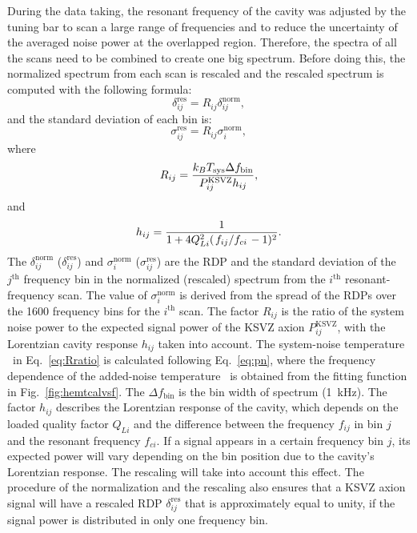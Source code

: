 During the data taking, the resonant frequency of the cavity was  
adjusted by the tuning bar to scan a large range of frequencies and to 
reduce the uncertainty of the averaged noise power at the overlapped region. 
Therefore, the 
spectra of all the scans need to be combined to create one big spectrum. 
Before doing this, the normalized spectrum from each scan is rescaled and 
the rescaled spectrum is computed with the following formula:
\begin{equation}
  \label{eq:respower_eqn}
  \delta_{ij}^\text{res} = R_{ij}\delta_{ij}^\text{norm},
\end{equation}
and the standard deviation of each bin is:
\begin{equation}
  \label{eq:ressigma_eqn}
  \sigma_{ij}^\text{res} = R_{ij}\sigma_{i}^\text{norm},
\end{equation}
where 
 \begin{equation}
 R_{ij} = \frac{k_{B}T_\text{sys} \Delta f_\text{bin} }{P_{ij}^\text{KSVZ} h_{ij}}, 
 \label{eq:Rratio}
 \end{equation}
and 
 \begin{equation}
 h_{ij} = \frac{1}{1 + 4Q_{Li}^{2}(\left.f_{ij}\middle/f_{ci}\right.-1)^2}. 
 \label{eq:Lorentz}
 \end{equation}
The $\delta_{ij}^\text{norm}$ ($\delta_{ij}^\text{res}$) and 
$\sigma_{i}^\text{norm}$ ($\sigma_{ij}^\text{res}$) are the 
RDP and the standard deviation of the $j^\text{th}$ frequency bin in 
the normalized (rescaled) spectrum from the 
$i^\text{th}$ resonant-frequency scan. 
The value of $\sigma_{i}^\text{norm}$ is derived from the spread of the 
RDPs over the 1600 frequency bins for the $i^\text{th}$ scan. 
The factor $R_{ij}$ is the ratio of 
the system noise power to the expected signal power of the KSVZ axion 
$P_{ij}^\text{KSVZ}$, with the Lorentzian cavity response $h_{ij}$ 
taken into account. 
The system-noise temperature \tsys\ in Eq.~\eqref{eq:Rratio} is calculated 
following Eq.~\eqref{eq:pn},
 where the frequency dependence of the added-noise temperature \ta\ is 
obtained from the fitting function in Fig.~\ref{fig:hemtcalvsf}. 
The $\Delta f_\text{bin}$ is the bin width of spectrum (1~kHz). 
The factor $h_{ij}$ describes the Lorentzian response of the cavity, 
which depends on the loaded quality factor $Q_{Li}$ and the 
difference between the frequency $f_{ij}$ in bin $j$ and the resonant 
frequency $f_{ci}$. 
%
If a signal appears in a certain frequency bin $j$, its expected power 
will vary depending on the bin position due to the cavity's 
Lorentzian response. The rescaling will take into account this effect. 
The procedure of the normalization and the rescaling also ensures that a 
KSVZ axion signal will have a rescaled RDP $\delta_{ij}^\text{res}$ 
that is approximately equal to unity, if the signal power is distributed 
in only one frequency bin. 

